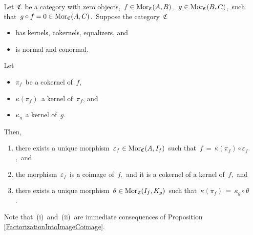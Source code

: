 \vskip 0.5cm
\begin{proposition}\label{propositionHomology}
\mbox{}
\vskip 0.1cm
\noindent
Let \,$\mathfrak{C}$\, be a category with zero objects,
\,$f \in \textnormal{Mor}_{\mathfrak{C}}(A,B)$,\,
\,$g \in \textnormal{Mor}_{\mathfrak{C}}(B,C)$,\, such that
\,$g \circ f = 0 \in \textnormal{Mor}_{\mathfrak{C}}(A,C)$.\,
\vskip 0.1cm
\noindent
Suppose the category \,$\mathfrak{C}$\,
\begin{itemize}
\item
	has kernels, cokernels, equalizers, and
\item
	is normal and conormal.
\end{itemize}
Let
\begin{itemize}
\item
	$\pi_{f}$\, be a cokernel of \,$f$,
\item
	$\kappa(\pi_{f})$\, a kernel of \,$\pi_{f}$, and
\item
	$\kappa_{g}$\, a kernel of \,$g$.
\end{itemize}
Then,
\begin{enumerate}
\item
	there exists a unique morphism \,$\varepsilon_{f} \in \textnormal{Mor}_{\mathfrak{C}}(A,I_{f})$\,
	such that \,$f \,=\, \kappa(\pi_{f}) \circ \varepsilon_{f}$,\, and
\item
	the morphism \,$\varepsilon_{f}$\, is a coimage of \,$f$,\, and
	it is a cokernel of a kernel of \,$f$,\, and
\item
	there exists a unique morphism \,$\theta \in \textnormal{Mor}_{\mathfrak{C}}(I_{f},K_{g})$\,
	such that \,$\kappa(\pi_{f}) \,=\, \kappa_{g} \circ \theta$.
\end{enumerate}
\begin{center}
\end{center}
\end{proposition}
\proof
Note that \,(i)\, and \,(ii)\, are immediate consequences of Proposition \ref{FactorizationIntoImageCoimage}.
